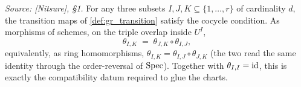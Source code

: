 \begin{lemma}\leanok
  \label{lem:gr_cocycle}
  \textit{Source: [Nitsure], \S 1.}
  For any three subsets \(I, J, K \subseteq \{1, \dots, r\}\) of cardinality
  \(d\), the transition maps of \cref{def:gr_transition} satisfy the cocycle
  condition. As morphisms of schemes, on the triple overlap inside \(U^I\),
  \[
    \theta_{I,K} \;=\; \theta_{J,K} \circ \theta_{I,J},
  \]
  equivalently, as ring homomorphisms,
  \(\theta_{I,K} = \theta_{I,J} \circ \theta_{J,K}\) (the two read the same
  identity through the order-reversal of \(\operatorname{Spec}\)). Together with
  \(\theta_{I,I} = \operatorname{id}\), this is exactly the compatibility datum required to
  glue the charts.
\end{lemma}

